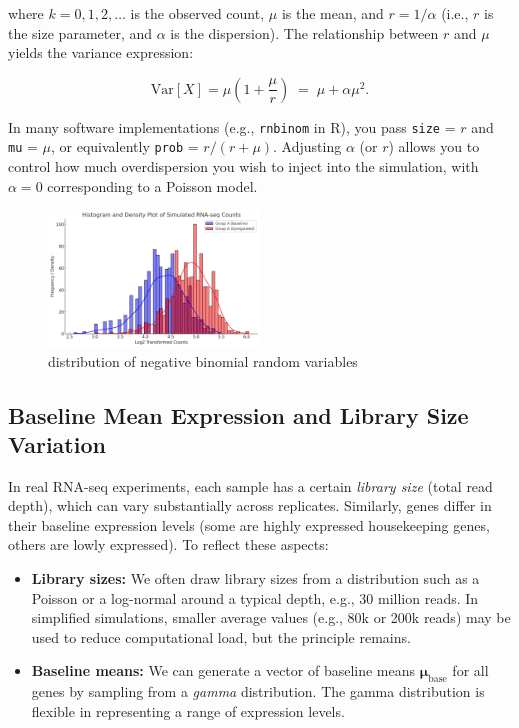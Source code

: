 \documentclass[12pt]{article}
\begin{document}
where $k = 0, 1, 2, \dots$ is the observed count, $\mu$ is the mean, and $r = 1/\alpha$ (i.e., $r$ is the size parameter, and $\alpha$ is the dispersion). The relationship between $r$ and $\mu$ yields the variance expression:

\[
\text{Var}[X] = \mu \left(1 + \frac{\mu}{r}\right) \;=\; \mu + \alpha \mu^2.
\]

In many software implementations (e.g., \texttt{rnbinom} in R), you pass \texttt{size} = $r$ and \texttt{mu} = $\mu$, or equivalently \texttt{prob} = $r/(r+\mu)$. Adjusting $\alpha$ (or $r$) allows you to control how much overdispersion you wish to inject into the simulation, with $\alpha = 0$ corresponding to a Poisson model.


\begin{figure}[h]
  \centering
  \includegraphics[width=0.5\textwidth]{figure/output.png}  %
  \caption{distribution of negative binomial random variables} 
\end{figure}


\subsection{Baseline Mean Expression and Library Size Variation}
\label{subsec:baselinemean}
In real RNA-seq experiments, each sample has a certain \emph{library size} (total read depth), which can vary substantially across replicates. Similarly, genes differ in their baseline expression levels (some are highly expressed housekeeping genes, others are lowly expressed). To reflect these aspects:

\begin{itemize}
\item \textbf{Library sizes:} We often draw library sizes from a distribution such as a Poisson or a log-normal around a typical depth, e.g., 30 million reads. In simplified simulations, smaller average values (e.g., 80k or 200k reads) may be used to reduce computational load, but the principle remains. 
\item \textbf{Baseline means:} We can generate a vector of baseline means $\boldsymbol{\mu}_\text{base}$ for all genes by sampling from a \emph{gamma} distribution. The gamma distribution is flexible in representing a range of expression levels. 
\end{itemize}
\end{document}
